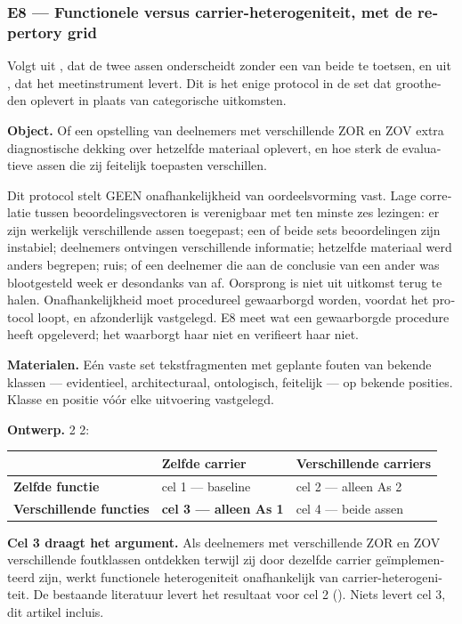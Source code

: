 \begin{dutch}
\subsubsection*{E8 — Functionele versus carrier-heterogeniteit, met de repertory grid}
\label{sec:nl:x-e8-functionele-versus-carrier-heterogeni}

Volgt uit , dat de twee assen onderscheidt zonder een van beide te toetsen, en uit , dat het meetinstrument levert. Dit is het enige protocol in de set dat grootheden oplevert in plaats van categorische uitkomsten.

\textbf{Object.} Of een opstelling van deelnemers met verschillende ZOR en ZOV extra diagnostische dekking over hetzelfde materiaal oplevert, en hoe sterk de evaluatieve assen die zij feitelijk toepasten verschillen.

Dit protocol stelt GEEN onafhankelijkheid van oordeelsvorming vast. Lage correlatie tussen beoordelingsvectoren is verenigbaar met ten minste zes lezingen: er zijn werkelijk verschillende assen toegepast; een of beide sets beoordelingen zijn instabiel; deelnemers ontvingen verschillende informatie; hetzelfde materiaal werd anders begrepen; ruis; of een deelnemer die aan de conclusie van een ander was blootgesteld week er desondanks van af. Oorsprong is niet uit uitkomst terug te halen. Onafhankelijkheid moet procedureel gewaarborgd worden, voordat het protocol loopt, en afzonderlijk vastgelegd. E8 meet wat een gewaarborgde procedure heeft opgeleverd; het waarborgt haar niet en verifieert haar niet.

\textbf{Materialen.} Eén vaste set tekstfragmenten met geplante fouten van bekende klassen — evidentieel, architecturaal, ontologisch, feitelijk — op bekende posities. Klasse en positie vóór elke uitvoering vastgelegd.

\textbf{Ontwerp.} 2 \gtimes{} 2:

\begin{center}
\small
\begin{tabularx}{\linewidth}{>{\raggedright\arraybackslash}X>{\raggedright\arraybackslash}X>{\raggedright\arraybackslash}X}
\toprule
 & \textbf{Zelfde carrier} & \textbf{Verschillende carriers} \\
\midrule
\textbf{Zelfde functie} & cel 1 — baseline & cel 2 — alleen As 2 \\
\textbf{Verschillende functies} & \textbf{cel 3 — alleen As 1} & cel 4 — beide assen \\
\bottomrule
\end{tabularx}
\end{center}
\textbf{Cel 3 draagt het argument.} Als deelnemers met verschillende ZOR en ZOV verschillende foutklassen ontdekken terwijl zij door dezelfde carrier geïmplementeerd zijn, werkt functionele heterogeniteit onafhankelijk van carrier-heterogeniteit. De bestaande literatuur levert het resultaat voor cel 2 (). Niets levert cel 3, dit artikel incluis.


\end{dutch}
